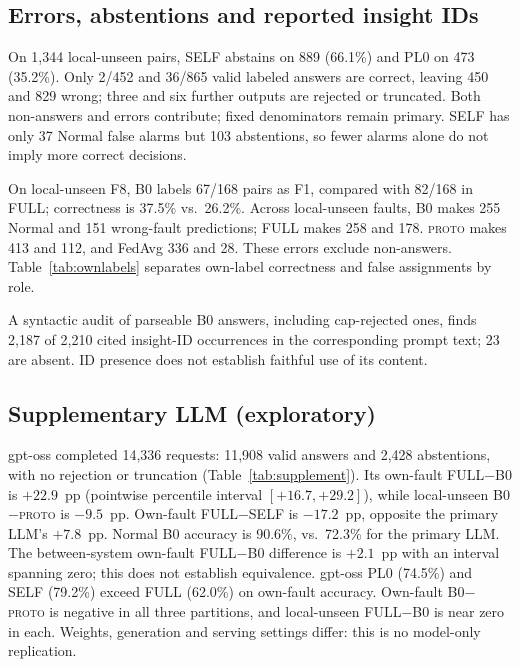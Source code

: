 \documentclass[conference]{IEEEtran}
\newcommand{\PROTO}{\textsc{proto}}
\newcommand{\cond}[1]{\textsf{#1}}
\begin{document}
\subsection{Errors, abstentions and reported insight IDs}
On 1,344 local-unseen pairs, \cond{SELF} abstains on 889 (66.1\%) and \cond{PL0} on 473 (35.2\%). Only 2/452 and 36/865 valid labeled answers are correct, leaving 450 and 829 wrong; three and six further outputs are rejected or truncated. Both non-answers and errors contribute; fixed denominators remain primary. \cond{SELF} has only 37 Normal false alarms but 103 abstentions, so fewer alarms alone do not imply more correct decisions.

On local-unseen F8, \cond{B0} labels 67/168 pairs as F1, compared with 82/168 in \cond{FULL}; correctness is 37.5\% vs.\ 26.2\%. Across local-unseen faults, \cond{B0} makes 255 Normal and 151 wrong-fault predictions; \cond{FULL} makes 258 and 178. \PROTO{} makes 413 and 112, and FedAvg 336 and 28. These errors exclude non-answers. Table~\ref{tab:ownlabels} separates own-label correctness and false assignments by role.

A syntactic audit of parseable \cond{B0} answers, including cap-rejected ones, finds 2,187 of 2,210 cited insight-ID occurrences in the corresponding prompt text; 23 are absent. ID presence does not establish faithful use of its content.

\begin{table}[!t]
\centering\footnotesize
\caption{LLM assignments of the receiver's own label. Own-fault entries are correct; local-unseen and Normal entries are false assignments. Denominators include all planned decisions.}
\label{tab:ownlabels}
\setlength{\tabcolsep}{5pt}

\end{table}

\subsection{Supplementary LLM (exploratory)}
gpt-oss completed 14,336 requests: 11,908 valid answers and 2,428 abstentions, with no rejection or truncation (Table~\ref{tab:supplement}). Its own-fault \cond{FULL}$-$\cond{B0} is $+22.9$~pp (pointwise percentile interval $[+16.7,+29.2]$), while local-unseen \cond{B0}$-$\PROTO{} is $-9.5$~pp. Own-fault \cond{FULL}$-$\cond{SELF} is $-17.2$~pp, opposite the primary LLM's $+7.8$~pp. Normal \cond{B0} accuracy is 90.6\%, vs.\ 72.3\% for the primary LLM. The between-system own-fault \cond{FULL}$-$\cond{B0} difference is $+2.1$~pp with an interval spanning zero; this does not establish equivalence. gpt-oss \cond{PL0} (74.5\%) and \cond{SELF} (79.2\%) exceed \cond{FULL} (62.0\%) on own-fault accuracy. Own-fault \cond{B0}$-$\PROTO{} is negative in all three partitions, and local-unseen \cond{FULL}$-$\cond{B0} is near zero in each. Weights, generation and serving settings differ: this is no model-only replication.
\end{document}
